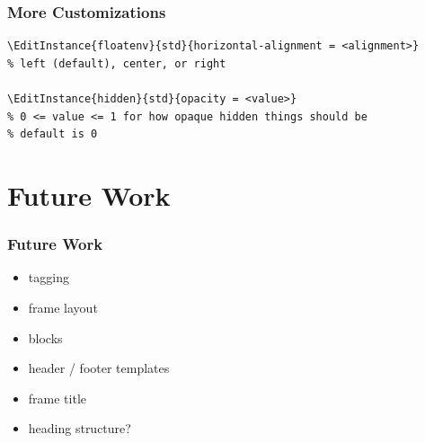 \documentclass{ltx-talk}
\begin{document}
\begin{frame*}
\frametitle{More Customizations}
\begin{verbatim}
\EditInstance{floatenv}{std}{horizontal-alignment = <alignment>}
% left (default), center, or right

\EditInstance{hidden}{std}{opacity = <value>}
% 0 <= value <= 1 for how opaque hidden things should be
% default is 0
\end{verbatim}
\end{frame*}

\section{Future Work}

\begin{frame}
\frametitle{Future Work}
\begin{itemize}
\item tagging
\item frame layout
\item blocks
\item header / footer templates
\item frame title
\item heading structure?
\end{itemize}
\end{frame}
\end{document}
